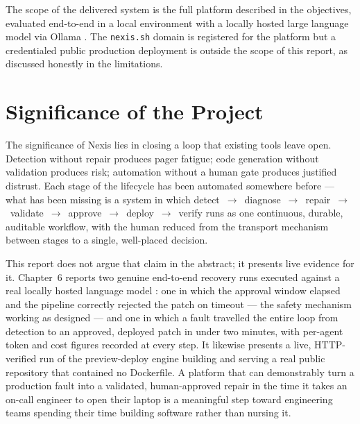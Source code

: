 The scope of the delivered system is the full platform described in the
objectives, evaluated end-to-end in a local environment with a locally hosted
large language model via Ollama \cite{ollama}. The \texttt{nexis.sh} domain is
registered for the platform but a credentialed public production deployment
is outside the scope of this report, as discussed honestly in the limitations.

\section{Significance of the Project}

The significance of Nexis lies in closing a loop that existing tools leave
open. Detection without repair produces pager fatigue; code generation without
validation produces risk; automation without a human gate produces justified
distrust. Each stage of the lifecycle has been automated somewhere before ---
what has been missing is a system in which
detect~$\rightarrow$~diagnose~$\rightarrow$~repair~$\rightarrow$~validate~$\rightarrow$~approve~$\rightarrow$~deploy~$\rightarrow$~verify
runs as one continuous, durable, auditable workflow, with the human reduced
from the transport mechanism between stages to a single, well-placed decision.

This report does not argue that claim in the abstract; it presents live
evidence for it. Chapter~6 reports two genuine end-to-end recovery runs
executed against a real locally hosted language model \cite{ollama}: one in
which the approval window elapsed and the pipeline correctly rejected the
patch on timeout --- the safety mechanism working as designed --- and one in
which a fault travelled the entire loop from detection to an approved,
deployed patch in under two minutes, with per-agent token and cost figures
recorded at every step. It likewise presents a live, HTTP-verified run of the
preview-deploy engine building and serving a real public repository that
contained no Dockerfile. A platform that can demonstrably turn a production
fault into a validated, human-approved repair in the time it takes an on-call
engineer to open their laptop is a meaningful step toward engineering teams
spending their time building software rather than nursing it.
